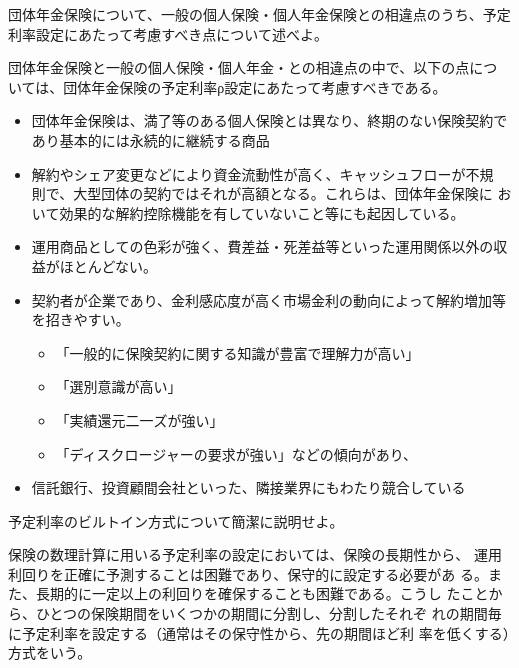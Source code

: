 \documentclass[report,gutter=10mm,fore-edge=10mm,uplatex,dvipdfmx]{jlreq}
\begin{document}

団体年金保険について、一般の個人保険・個人年金保険との相違点のうち、予定利率設定にあたって考慮すべき点について述べよ。


団体年金保険と一般の個人保険・個人年金・との相違点の中で、以下の点につ
いては、団体年金保険の予定利率ρ設定にあたって考慮すべきである。

\begin{itemize}
\tightlist
\item
  団体年金保険は、満了等のある個人保険とは異なり、終期のない保険契約であり基本的には永続的に継続する商品

\item
解約やシェア変更などにより資金流動性が高く、キャッシュフローが不規
則で、大型団体の契約ではそれが高額となる。これらは、団体年金保険に
おいて効果的な解約控除機能を有していないこと等にも起因している。

  \item
  運用商品としての色彩が強く、費差益・死差益等といった運用関係以外の収益がほとんどない。
\item
  契約者が企業であり、金利感応度が高く市場金利の動向によって解約増加等を招きやすい。

  \begin{itemize}
  \tightlist
  \item
    「一般的に保険契約に関する知識が豊富で理解力が高い」
  \item
    「選別意識が高い」
  \item
    「実績還元二一ズが強い」
  \item
    「ディスクロージャーの要求が強い」などの傾向があり、
  \end{itemize}
\item
  信託銀行、投資顧間会社といった、隣接業界にもわたり競合している

\end{itemize}


予定利率のビルトイン方式について簡潔に説明せよ。


保険の数理計算に用いる予定利率の設定においては、保険の長期性から、
運用利回りを正確に予測することは困難であり、保守的に設定する必要があ
る。また、長期的に一定以上の利回りを確保することも困難である。こうし
たことから、ひとつの保険期間をいくつかの期間に分割し、分割したそれぞ
れの期間毎に予定利率を設定する（通常はその保守性から、先の期間ほど利
率を低くする）方式をいう。
\end{document}
